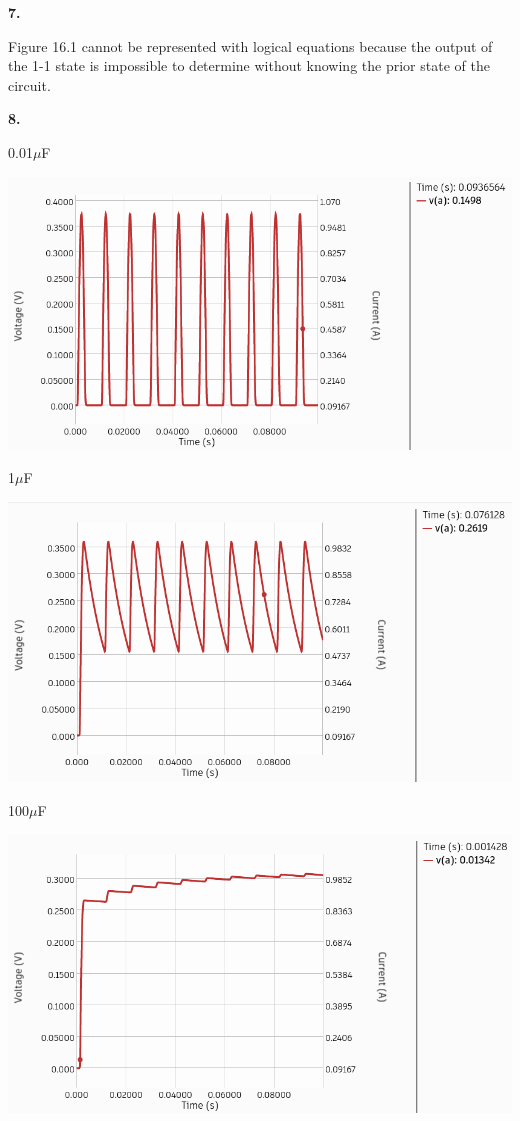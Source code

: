 \documentclass{article}
\begin{document}
\newpage\noindent\textbf{7.}

	Figure 16.1 cannot be represented with logical equations because the output of the 1-1 state is impossible to determine without knowing the prior state of the circuit.

\newpage\noindent\textbf{8.}

    \begin{center}
        0.01$\mu$F
        
        \includegraphics[scale=.4]{81.png}

        \medskip

        1$\mu$F

        \includegraphics[scale=.4]{810.png}

        \medskip

        100$\mu$F

        \includegraphics[scale=.4]{8100.png}
    \end{center}
\end{document}
